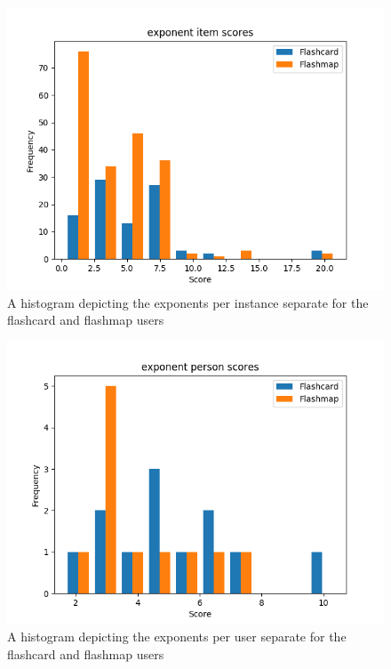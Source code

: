 \begin{figure}
    \centering
    \includegraphics[width=.7\textwidth]{img/exponent_diff.png}
    \caption{A histogram depicting the exponents per instance separate for the flashcard and flashmap users}
    \label{fig:exponent_diff}
\end{figure}
\begin{figure}
    \centering
    \includegraphics[width=.7\textwidth]{img/exponent_abil.png}
    \caption{A histogram depicting the exponents per user separate for the flashcard and flashmap users}
    \label{fig:exponent_abil}
\end{figure}

